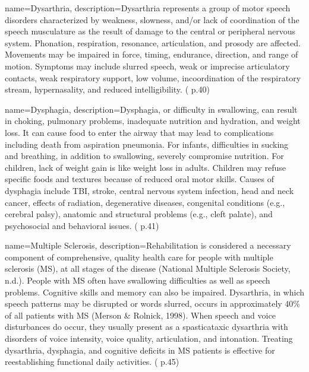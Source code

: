  {
	name={Dysarthria}, 
	description={Dysarthria represents a group of motor speech disorders characterized by weakness, slowness, and/or lack of coordination of the speech musculature as the result of damage to the central or peripheral nervous system. Phonation, respiration, resonance, articulation, and prosody are affected. Movements may be impaired in force, timing, endurance, direction, and range of motion. Symptoms may include slurred speech, weak or imprecise articulatory contacts, weak respiratory support, low volume, incoordination of the respiratory stream, hypernasality, and reduced intelligibility. (\cite{SLPathologies} p.40)
}
}

 {
	name={Dysphagia}, 
	description={Dysphagia, or difficulty in swallowing, can result in choking, pulmonary problems, inadequate nutrition and hydration, and weight loss. It can cause food to enter the airway that may lead to complications including death from aspiration pneumonia. For infants, difficulties in sucking and breathing, in addition to swallowing, severely compromise nutrition. For children, lack of weight gain is like weight loss in adults. Children may refuse specific foods and textures because of reduced oral motor skills. Causes of dysphagia include TBI, stroke, central nervous system infection, head and neck cancer, effects of radiation, degenerative diseases, congenital conditions (e.g., cerebral palsy), anatomic and structural problems (e.g., cleft palate), and psychosocial and behavioral issues. (\cite{SLPathologies} p.41)
}
}

 {
	name={Multiple Sclerosis}, 
	description={Rehabilitation is considered a necessary component of comprehensive, quality health care for people with multiple sclerosis (MS), at all stages of the disease (National Multiple Sclerosis Society, n.d.). People with MS often have swallowing difficulties as well as speech problems. Cognitive skills and memory can also be impaired. Dysarthria, in which speech patterns may be disrupted or words slurred, occurs in approximately 40\% of all patients with MS (Merson \& Rolnick, 1998). When speech and voice disturbances do occur, they usually present as a spasticataxic dysarthria with disorders of voice intensity, voice quality, articulation, and intonation. Treating dysarthria, dysphagia, and cognitive deficits in MS patients is effective for reestablishing functional daily activities. (\cite{SLPathologies} p.45)
}%
}

